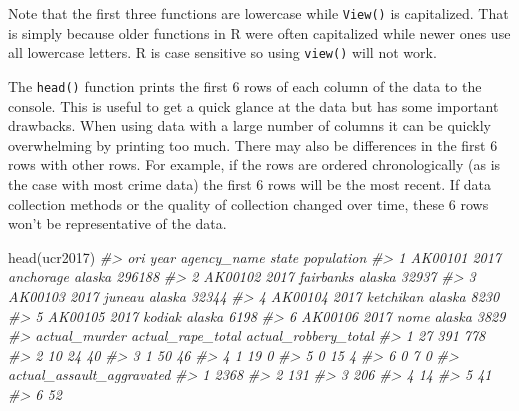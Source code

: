 \documentclass[
]{krantz}
\makeatletter
\newenvironment{Shaded}{\begin{snugshade}}{\end{snugshade}}
\newcommand{\CommentTok}[1]{\textcolor[rgb]{0.37,0.37,0.37}{\textit{#1}}}
\newcommand{\FunctionTok}[1]{\textcolor[rgb]{0,0,0}{#1}}
\newcommand{\NormalTok}[1]{#1}
\newenvironment{kframe}{%
\medskip{}
\setlength{\fboxsep}{.8em}
 \def\at@end@of@kframe{}%
 \ifinner\ifhmode%
  \def\at@end@of@kframe{\end{minipage}}%
  \begin{minipage}{\columnwidth}%
 \fi\fi%
 \def\FrameCommand##1{\hskip\@totalleftmargin \hskip-\fboxsep
 \colorbox{shadecolor}{##1}\hskip-\fboxsep
     \hskip-\linewidth \hskip-\@totalleftmargin \hskip\columnwidth}%
 \MakeFramed {\advance\hsize-\width
   \@totalleftmargin\z@ \linewidth\hsize
   \@setminipage}}%
 {\par\unskip\endMakeFramed%
 \at@end@of@kframe}
\renewenvironment{Shaded}{\begin{kframe}}{\end{kframe}}
\makeatother
\begin{document}
Note that the first three functions are lowercase while \texttt{View()} is capitalized. That is simply because older functions in R were often capitalized while newer ones use all lowercase letters. R is case sensitive so using \texttt{view()} will not work.

The \texttt{head()} function prints the first 6 rows of each column of the data to the console. This is useful to get a quick glance at the data but has some important drawbacks. When using data with a large number of columns it can be quickly overwhelming by printing too much. There may also be differences in the first 6 rows with other rows. For example, if the rows are ordered chronologically (as is the case with most crime data) the first 6 rows will be the most recent. If data collection methods or the quality of collection changed over time, these 6 rows won't be representative of the data.

\begin{Shaded}
\begin{Highlighting}[]
\FunctionTok{head}\NormalTok{(ucr2017)}
\CommentTok{\#\textgreater{}       ori year agency\_name  state population}
\CommentTok{\#\textgreater{} 1 AK00101 2017   anchorage alaska     296188}
\CommentTok{\#\textgreater{} 2 AK00102 2017   fairbanks alaska      32937}
\CommentTok{\#\textgreater{} 3 AK00103 2017      juneau alaska      32344}
\CommentTok{\#\textgreater{} 4 AK00104 2017   ketchikan alaska       8230}
\CommentTok{\#\textgreater{} 5 AK00105 2017      kodiak alaska       6198}
\CommentTok{\#\textgreater{} 6 AK00106 2017        nome alaska       3829}
\CommentTok{\#\textgreater{}   actual\_murder actual\_rape\_total actual\_robbery\_total}
\CommentTok{\#\textgreater{} 1            27               391                  778}
\CommentTok{\#\textgreater{} 2            10                24                   40}
\CommentTok{\#\textgreater{} 3             1                50                   46}
\CommentTok{\#\textgreater{} 4             1                19                    0}
\CommentTok{\#\textgreater{} 5             0                15                    4}
\CommentTok{\#\textgreater{} 6             0                 7                    0}
\CommentTok{\#\textgreater{}   actual\_assault\_aggravated}
\CommentTok{\#\textgreater{} 1                      2368}
\CommentTok{\#\textgreater{} 2                       131}
\CommentTok{\#\textgreater{} 3                       206}
\CommentTok{\#\textgreater{} 4                        14}
\CommentTok{\#\textgreater{} 5                        41}
\CommentTok{\#\textgreater{} 6                        52}
\end{Highlighting}
\end{Shaded}
\end{document}
